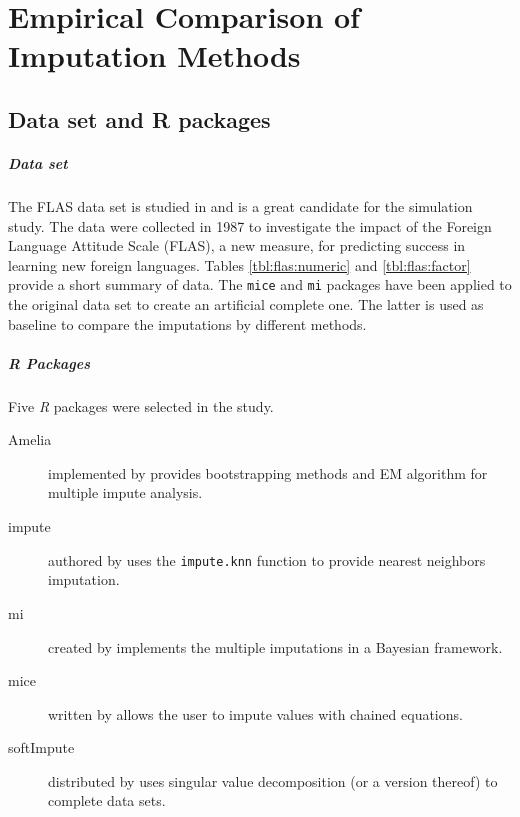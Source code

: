 \chapter{Empirical Comparison of Imputation Methods}



\section{Data set and R packages}

\paragraph{Data set} The FLAS data set is studied in \cite{schafer1997analysis} and is a great
candidate for the simulation study. The data were collected in 1987 to
investigate the impact of the Foreign Language Attitude Scale (FLAS), a new
measure, for predicting success in learning new foreign languages. Tables
\ref{tbl:flas:numeric} and \ref{tbl:flas:factor} provide a short summary of
data. The \texttt{mice} and \texttt{mi} packages have been applied to the original
data set to create an artificial complete one. The latter is used as baseline
to compare the imputations by different methods.

\paragraph{R Packages}

Five \emph{R} packages were selected in the study.

\begin{description}
\item[Amelia] implemented by \cite{honaker2011amelia} provides bootstrapping
  methods and EM algorithm for multiple impute analysis.
\item[impute] authored by \cite{hastie1999impute} uses the
  \texttt{impute.knn} function to provide nearest neighbors imputation.
\item[mi] created by \cite{gelman2011mi} implements the multiple imputations in
  a Bayesian framework.
\item[mice] written by \cite{vanburren2011mice} allows the user to impute
  values with chained equations.
\item[softImpute] distributed by \cite{hastie2015softimpute} uses singular value
  decomposition (or a version thereof) to complete data sets.
\end{description}

